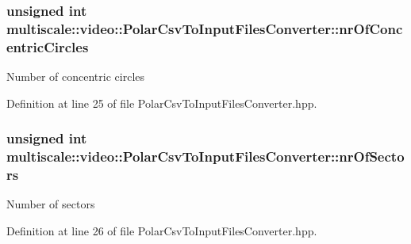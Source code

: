 \hypertarget{classmultiscale_1_1video_1_1PolarCsvToInputFilesConverter_a7aa37d18880e822369cbe118a093e24f}{
\subsubsection[{nr\-Of\-Concentric\-Circles}]{\setlength{\rightskip}{0pt plus 5cm}unsigned int multiscale\-::video\-::\-Polar\-Csv\-To\-Input\-Files\-Converter\-::nr\-Of\-Concentric\-Circles\hspace{0.3cm}{\ttfamily [private]}}}\label{classmultiscale_1_1video_1_1PolarCsvToInputFilesConverter_a7aa37d18880e822369cbe118a093e24f}
Number of concentric circles 

Definition at line 25 of file Polar\-Csv\-To\-Input\-Files\-Converter.\-hpp.

\hypertarget{classmultiscale_1_1video_1_1PolarCsvToInputFilesConverter_a9246a2c9749602af145d5579bde8a9d1}{
\subsubsection[{nr\-Of\-Sectors}]{\setlength{\rightskip}{0pt plus 5cm}unsigned int multiscale\-::video\-::\-Polar\-Csv\-To\-Input\-Files\-Converter\-::nr\-Of\-Sectors\hspace{0.3cm}{\ttfamily [private]}}}\label{classmultiscale_1_1video_1_1PolarCsvToInputFilesConverter_a9246a2c9749602af145d5579bde8a9d1}
Number of sectors 

Definition at line 26 of file Polar\-Csv\-To\-Input\-Files\-Converter.\-hpp.

